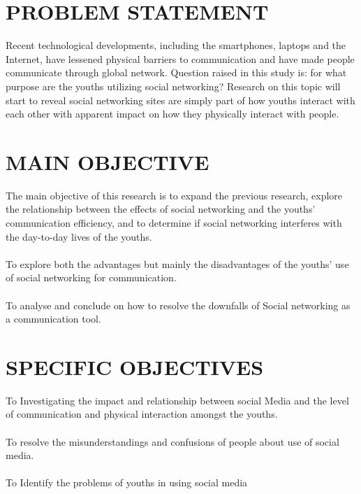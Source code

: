 \documentclass[11pt,A4paper]{article}
\begin{document}
\section{PROBLEM STATEMENT}
Recent technological developments, including the smartphones, laptops and the Internet, have lessened physical barriers to communication and have made people communicate through global network. Question raised in this study is: for what purpose are the youths utilizing social networking? Research on this topic will start to reveal social networking sites are simply part of how youths interact with each other with apparent impact on how they physically interact with people. 
\section{MAIN OBJECTIVE}
 						The main objective of this research is to expand the previous research, explore the relationship between the effects of social networking and the youths’ communication efficiency, and to determine if social networking interferes with the day-to-day lives of the youths.
\\	\\
To explore both the advantages but mainly the disadvantages of the youths’ use of social networking for communication. \\ \\
To analyse and conclude on how to resolve the downfalls of Social networking as a communication tool.
\section{SPECIFIC OBJECTIVES}
To Investigating the impact and relationship between social Media and the level of communication and physical interaction amongst the youths.
\\ \\
To resolve the misunderstandings and confusions of people about use of social media. 
\\ \\
To Identify the problems of youths in using social media 
\end{document}
